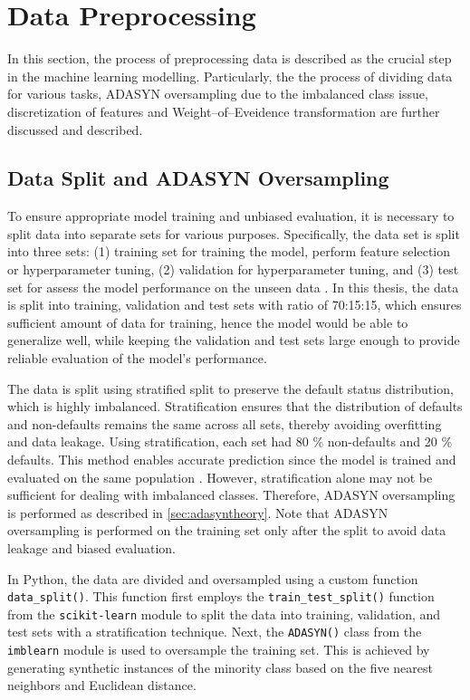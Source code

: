 \newpage
\section{Data Preprocessing}
\label{sec:dataprep}
In this section, the process of preprocessing data is described as the crucial step in the machine learning modelling. Particularly, the the process of dividing data for various tasks, ADASYN oversampling due to the imbalanced class issue, discretization of features and Weight--of--Eveidence transformation are further discussed and described.

\subsection{Data Split and ADASYN Oversampling}
\label{subsec:data-split-ADASYN}

To ensure appropriate model training and unbiased evaluation, it is necessary to split data into separate sets for various purposes. Specifically, the data set is split into three sets: (1) training set for training the model, perform feature selection or hyperparameter tuning, (2) validation for hyperparameter tuning, and (3) test set for assess the model performance on the unseen data \citep{subasi2020practical}.
In this thesis, the data is split into training, validation and test sets with ratio of 70:15:15, which ensures sufficient amount of data for training, hence the model would be able to generalize well, while keeping the validation and test sets large enough to provide reliable evaluation of the model's performance.

The data is split using stratified split to preserve the default status distribution, which is highly imbalanced.
Stratification ensures that the distribution of defaults and non-defaults remains the same across all sets, thereby avoiding overfitting and data leakage. Using stratification, each set had 80 \% non-defaults and 20 \% defaults. This method enables accurate prediction since the model is trained and evaluated on the same population \citep{igareta2021strat}.
However, stratification alone may not be sufficient for dealing with imbalanced classes. Therefore, ADASYN oversampling is performed as described in \autoref{sec:adasyntheory}. Note that ADASYN oversampling is performed on the training set only after the split to avoid data leakage and biased evaluation.

In Python, the data are divided and oversampled using a custom function \lstinline{data_split()}.
This function first employs the \lstinline{train_test_split()} function from the \lstinline{scikit-learn} module to split the data into training, validation, and test sets with a stratification technique.
Next, the \lstinline{ADASYN()} class from the \lstinline{imblearn} module is used to oversample the training set. This is achieved by generating synthetic instances of the minority class based on the five nearest neighbors and Euclidean distance.

